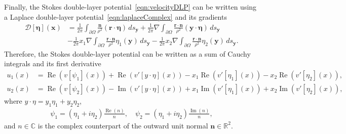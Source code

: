 \documentclass[3p]{elsarticle}
\newcommand{\Real}{\Re}
\newcommand{\Imag}{\Im}
\newcommand{\bd}{{\partial}}
\newcommand{\CC}{{\mathbb{C}}}
\newcommand{\DDD}{{\boldsymbol{\mathcal D}}}
\newcommand{\eeta}{{\boldsymbol\eta}}
\newcommand{\nn}{{\mathbf{n}}}
\newcommand{\rr}{{\mathbf{r}}}
\renewcommand{\Re}{{\operatorname{Re}}}
\renewcommand{\Im}{{\operatorname{Im}}}
\newcommand{\RR}{{\mathbb{R}}}
\newcommand{\xx}{{\mathbf{x}}}
\newcommand{\yy}{{\mathbf{y}}}
\begin{document}
Finally, the Stokes double-layer potential~\eqref{eqn:velocityDLP} can
be written using a Laplace double-layer
potential~\eqref{eqn:laplaceComplex} and its gradients 
\begin{equation}
  \label{eqn:Stokes2Laplace}
  \begin{aligned}
    \DDD[\eeta](\xx) &= 
      \frac{1}{2\pi} \int_{\bd\Omega} 
        \frac{\nn}{\rho^2} (\rr \cdot \eeta) \, ds_\yy + 
      \frac{1}{2\pi} \nabla \int_{\bd\Omega}
        \frac{\rr \cdot \nn}{\rho^2} (\yy \cdot \eeta) \, ds_\yy \\
      &- \frac{1}{2\pi} x_1 \nabla \int_{\bd\Omega}
        \frac{\rr \cdot \nn}{\rho^2}\eta_1(\yy) \, ds_\yy -
      \frac{1}{2\pi} x_2 \nabla \int_{\bd\Omega}
        \frac{\rr \cdot \nn}{\rho^2}\eta_2(\yy) \, ds_\yy.
  \end{aligned}
\end{equation}
Therefore, the Stokes double-layer potential can be written as a sum of
Cauchy integrals and its first derivative~\citep{bar-wu-vee2015}
\begin{equation}
  \begin{aligned}
    u_1(x) &= \Real (v[\psi_1](x)) + \Real (v'[y\cdot\eta](x)) 
             -x_1\Real (v'[\eta_1](x)) - x_2\Real (v'[\eta_2](x)), \\
    u_2(x) &= \Real (v[\psi_2](x)) - \Imag (v'[y\cdot\eta](x)) 
         +x_1\Imag (v'[\eta_1](x)) + x_2\Imag (v'[\eta_2](x)),
  \end{aligned}
  \label{eqn:cauchyVelocity}
\end{equation}
where $y \cdot \eta = y_1 \eta_1 + y_2 \eta_2$, 
\begin{align} 
  \psi_1=(\eta_1+i\eta_2)\frac{\Real(n)}{n}, \quad
  \psi_2=(\eta_1+i\eta_2)\frac{\Imag(n)}{n},
\end{align}
and $n \in \CC$ is the complex counterpart of the outward unit normal
$\nn \in \RR^2$.

\end{document}

